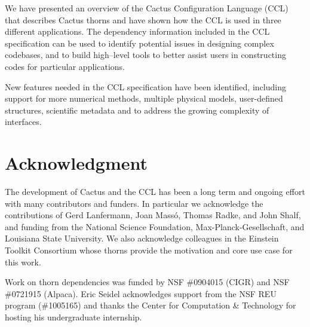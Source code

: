 \documentclass[conference]{IEEEtran}
\begin{document}
We have presented an overview of the Cactus Configuration Language (CCL) that describes Cactus thorns 
and have shown how the CCL is used in three different applications. 
The dependency information included in the CCL specification can be used to identify potential issues in designing 
complex codebases, and to build high--level tools to better assist users in constructing codes for particular applications. 

New features needed in the CCL specification have been identified, including support for more numerical methods, multiple physical 
models, user-defined structures, scientific metadata and to address the growing complexity of interfaces. 







\section*{Acknowledgment}

The development of Cactus and the CCL has been a long term and ongoing effort with many contributors and funders. In particular 
we acknowledge the contributions of Gerd Lanfermann, Joan Mass\'{o}, Thomas Radke, and John Shalf, and funding from the National Science Foundation, 
Max-Planck-Gesellschaft, and Louisiana State University. We also acknowledge colleagues in the Einstein Toolkit Consortium 
whose thorns provide the motivation and core use case for this work. 


Work on thorn dependencies  was funded by NSF
\#0904015 (CIGR)
and NSF \#0721915 (Alpaca). 
Eric Seidel acknowledges support from 
the NSF REU program (\#1005165) and thanks the Center for Computation \& Technology for hosting his undergraduate internship. 







\end{document}
